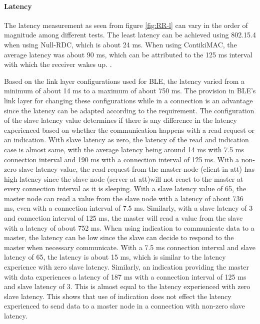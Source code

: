 \paragraph{Latency}
The latency measurement as seen from figure \ref{fig:RR-l} can vary in the order of magnitude among different tests. The least latency can be achieved using 802.15.4 when using Null-RDC, which is about 24 ms.  When using ContikiMAC, the average latency was about 90 ms, which can be attributed to the 125 ms interval with which the receiver wakes up. .  

Based on the link layer configurations used for BLE, the latency varied from a minimum of about 14 ms to a maximum of about 750 ms. The provision in BLE's link layer for changing these configurations while in a connection is an advantage since the latency can be adapted according to the requirement. The configuration of the slave latency value determines if there is any difference in the latency experienced based on whether the communication happens with a read request or an indication. With slave latency as zero, the latency of the read and indication case is almost same, with the average latency being around 14 ms with 7.5 ms connection interval and 190 ms with a connection interval of 125 ms. With a non-zero slave latency value, the read-request from the master node (client in \gls{att}) has high latency since the slave node (server at \gls{att})will not react to the master at every connection interval as it is sleeping. With a slave latency value of 65, the master node can read a value from the slave node with a latency of about 736 ms, even with a connection interval of 7.5 ms. Similarly, with a slave latency of 3 and connection interval of 125 ms, the master will read a value from the slave with a latency of about 752 ms. When using indication to communicate data to a master, the latency can be low since the slave can decide to respond to the master when necessary communicate. With a 7.5 ms connection interval and slave latency of 65, the latency is about 15 ms, which is similar to the latency experience with zero slave latency. Similarly, an indication providing the master with data experiences a latency of 187 ms with a connection interval of 125 ms and slave latency of 3. This is almost equal to the latency experienced with zero slave latency. This shows that use of indication does not effect the latency experienced to send data to a master node in a connection with non-zero slave latency.

